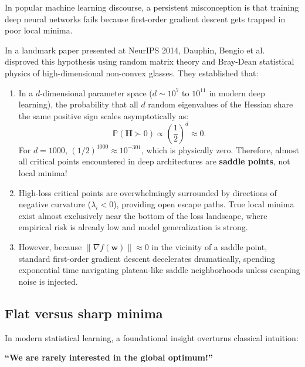 In popular machine learning discourse, a persistent misconception is that training deep neural networks fails because first-order gradient descent gets trapped in poor local minima.

In a landmark paper presented at NeurIPS 2014, Dauphin, Bengio et al.~\cite{dauphin2014identifying} disproved this hypothesis using random matrix theory and Bray-Dean statistical physics of high-dimensional non-convex glasses. They established that:
\begin{enumerate}
  \item In a $d$-dimensional parameter space ($d \sim 10^7$ to $10^{11}$ in modern deep learning), the probability that all $d$ random eigenvalues of the Hessian share the same positive sign scales asymptotically as:
  \begin{equation}
  \mathbb{P}(\mathbf{H} \succ 0) \propto \left(\frac{1}{2}\right)^d \approx 0.
  \label{eq:saddle_point_probability}
  \end{equation}
  For $d = 1000$, $(1/2)^{1000} \approx 10^{-301}$, which is physically zero. Therefore, almost all critical points encountered in deep architectures are \textbf{saddle points}, not local minima!
  \item High-loss critical points are overwhelmingly surrounded by directions of negative curvature ($\lambda_i < 0$), providing open escape paths. True local minima exist almost exclusively near the bottom of the loss landscape, where empirical risk is already low and model generalization is strong.
  \item However, because $\|\nabla f(\mathbf{w})\| \approx 0$ in the vicinity of a saddle point, standard first-order gradient descent decelerates dramatically, spending exponential time navigating plateau-like saddle neighborhoods unless escaping noise is injected.
\end{enumerate}

\subsection{Flat versus sharp minima}
\label{sec:global_optimum_fallacy}
\label{sec:flat_vs_sharp_minima}

In modern statistical learning, a foundational insight overturns classical intuition:
\begin{center}
\textbf{\Large\color{politoNavy} ``We are rarely interested in the global optimum!''}
\end{center}

